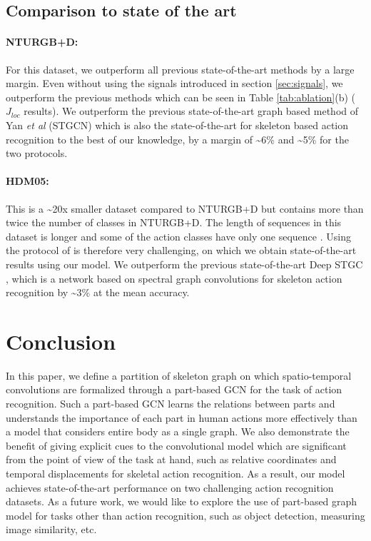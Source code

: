 \documentclass{bmvc2k}
\def\etal{\emph{et al}\bmvaOneDot}
\begin{document}
\subsection{Comparison to state of the art}
\label{sec:5_3}
\paragraph{\textsc{NTURGB+D}:} For this dataset, we outperform all previous state-of-the-art methods by a large margin. Even without using the signals introduced in section \ref{sec:signals}, we outperform the previous methods which can be seen in Table \ref{tab:ablation}(b) ($J_{loc}$ results). We outperform the previous state-of-the-art graph based method of Yan \etal \cite{yan2018spatial} (STGCN) which is also the state-of-the-art for skeleton based action recognition to the best of our knowledge, by a margin of \textasciitilde6\% and \textasciitilde5\% for the two protocols.

\paragraph{\textsc{HDM05}:} This is a \textasciitilde20x smaller dataset compared to NTURGB+D but contains more than twice the number of classes in NTURGB+D. The length of sequences in this dataset is longer and some of the action classes have only one sequence \cite{Cho2014ClassifyingAV}. Using the protocol of \cite{huang2017riemannian} is therefore very challenging, on which we obtain state-of-the-art results using our model. We outperform the previous state-of-the-art Deep STGC \cite{li2018spatio}, which is a network based on spectral graph convolutions for skeleton action recognition by \textasciitilde3\% at the mean accuracy.
\section{Conclusion}
\label{sec:conclusion}
In this paper, we define a partition of skeleton graph on which spatio-temporal convolutions are formalized through a part-based GCN for the task of action recognition. Such a part-based GCN learns the relations between parts and understands the importance of each part in human actions more effectively than a model that considers entire body as a single graph. We also demonstrate the benefit of giving explicit cues to the convolutional model which are significant from the point of view of the task at hand, such as relative coordinates and temporal displacements for skeletal action recognition. As a result, our model achieves state-of-the-art performance on two challenging action recognition datasets. As a future work, we would like to explore the use of part-based graph model for tasks other than action recognition, such as object detection, measuring image similarity, etc.


\end{document}
